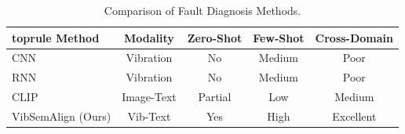 \begin{table}[htbp]
\centering
\caption{Comparison of Fault Diagnosis Methods.}
\label{tab:I}
\begin{tabular}{@{}lcccc@{}}
\\toprule
Method & Modality & Zero-Shot & Few-Shot & Cross-Domain \\
\midrule
CNN & Vibration & No & Medium & Poor & \\
RNN & Vibration & No & Medium & Poor & \\
CLIP & Image-Text & Partial & Low & Medium & \\
VibSemAlign (Ours) & Vib-Text & Yes & High & Excellent & \\
\bottomrule
\end{tabular}
\end{table}
